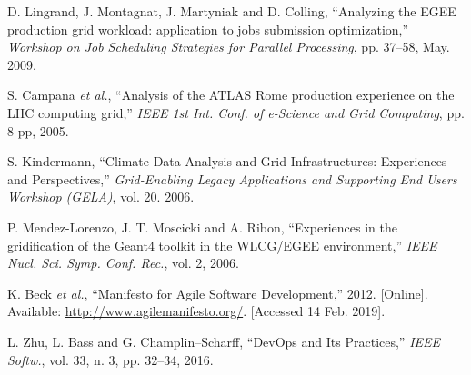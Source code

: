 \begin{thebibliography}{1}


D. Lingrand, J. Montagnat, J. Martyniak and D. Colling,
``Analyzing the EGEE production grid workload: application to jobs submission optimization,''
\emph{Workshop on Job Scheduling Strategies for Parallel Processing},
pp. 37--58, May. 2009.

S. Campana  \emph{et al.},
``Analysis of the ATLAS Rome production experience on the LHC computing grid,''
\emph{IEEE 1st Int. Conf. of e-Science and Grid Computing},
pp. 8-pp, 2005.

S. Kindermann,
``Climate Data Analysis and Grid Infrastructures: Experiences and Perspectives,''
\emph{Grid-Enabling Legacy Applications and Supporting End Users Workshop (GELA)},
vol. 20. 2006.

P. Mendez-Lorenzo, J. T. Moscicki and A. Ribon,
``Experiences in the gridification of the Geant4 toolkit in the WLCG/EGEE environment,''
\emph{IEEE Nucl. Sci. Symp. Conf. Rec.},
vol. 2, 2006.


K. Beck \emph{et al.},
``Manifesto for Agile Software Development,'' 2012.
[Online]. Available: \url{http://www.agilemanifesto.org/}.
[Accessed 14 Feb. 2019].

L. Zhu, L. Bass and G. Champlin--Scharff,
``DevOps and Its Practices,''
\emph{IEEE Softw.},
vol. 33, n. 3, pp. 32--34, 2016.





\end{thebibliography}
